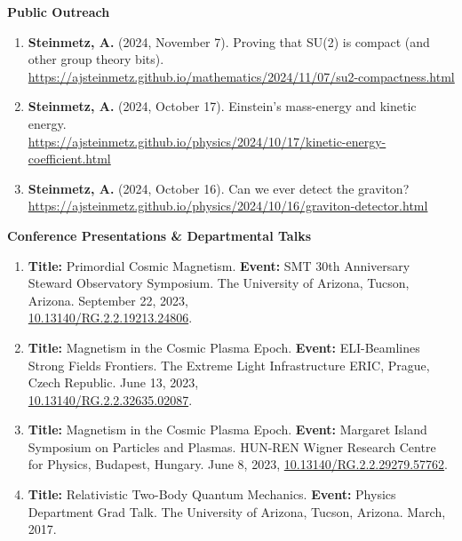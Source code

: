 \documentclass[11pt]{article}
\begin{document}
\medskip

{\large\textbf{Public Outreach}}

\begin{enumerate}[leftmargin=*,nosep]
    \item \textbf{Steinmetz, A.} (2024, November 7). Proving that SU(2) is compact (and other group theory bits). \href{https://ajsteinmetz.github.io/mathematics/2024/11/07/su2-compactness.html}{https://ajsteinmetz.github.io/mathematics/2024/11/07/su2-compactness.html}
    \item \textbf{Steinmetz, A.} (2024, October 17). Einstein’s mass-energy and kinetic energy. \\ \href{https://ajsteinmetz.github.io/physics/2024/10/17/kinetic-energy-coefficient.html}{https://ajsteinmetz.github.io/physics/2024/10/17/kinetic-energy-coefficient.html}
    \item \textbf{Steinmetz, A.} (2024, October 16). Can we ever detect the graviton?\\ \href{https://ajsteinmetz.github.io/physics/2024/10/16/graviton-detector.html}{https://ajsteinmetz.github.io/physics/2024/10/16/graviton-detector.html}
\end{enumerate}

\medskip

{\Large\textbf{Conference Presentations \& Departmental Talks}}

\begin{enumerate}[leftmargin=*,nosep]
    \item \textbf{Title:} Primordial Cosmic Magnetism. \textbf{Event:} SMT 30th Anniversary Steward Observatory Symposium. The University of Arizona, Tucson, Arizona. September 22, 2023,\\ \href{http://dx.doi.org/10.13140/RG.2.2.19213.24806}{10.13140/RG.2.2.19213.24806}.
    \item \textbf{Title:} Magnetism in the Cosmic Plasma Epoch. \textbf{Event:} ELI-Beamlines Strong Fields Frontiers. The Extreme Light Infrastructure ERIC, Prague, Czech Republic. June 13, 2023,\\ \href{http://dx.doi.org/10.13140/RG.2.2.32635.02087}{10.13140/RG.2.2.32635.02087}.
    \item \textbf{Title:} Magnetism in the Cosmic Plasma Epoch. \textbf{Event:} Margaret Island Symposium on Particles and Plasmas. HUN-REN Wigner Research Centre for Physics, Budapest, Hungary. June 8, 2023, \href{http://dx.doi.org/10.13140/RG.2.2.29279.57762}{10.13140/RG.2.2.29279.57762}.
    \item \textbf{Title:} Relativistic Two-Body Quantum Mechanics. \textbf{Event:} Physics Department Grad Talk. The University of Arizona, Tucson, Arizona. March, 2017.
\end{enumerate}
\end{document}
